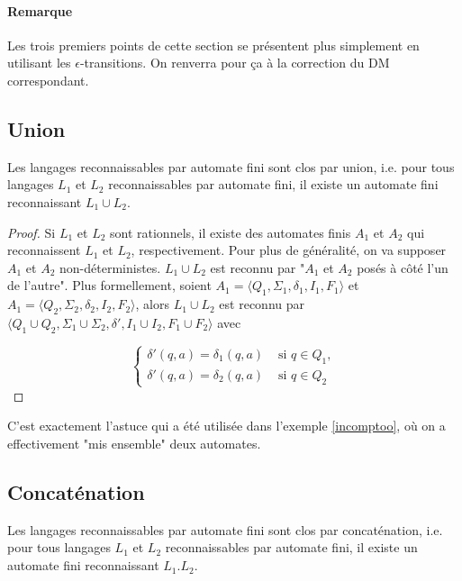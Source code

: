 \paragraph*{Remarque} Les trois premiers points de cette section se présentent plus simplement en utilisant les $\epsilon$-transitions. On renverra pour ça à la correction du DM correspondant.

\subsection{Union}

\begin{theorem}
Les langages reconnaissables par automate fini sont clos par union, i.e. pour tous langages $L_1$ et $L_2$ reconnaissables par automate fini, il existe un automate fini reconnaissant $L_1 \cup L_2$.
\end{theorem}

\begin{proof}

Si $L_1$ et $L_2$ sont rationnels, il existe des automates finis $A_1$ et $A_2$ qui reconnaissent $L_1$ et $L_2$, respectivement. Pour plus de généralité, on va supposer $A_1$ et $A_2$ non-déterministes. $L_1 \cup L_2$ est reconnu par "$A_1$ et $A_2$ posés à côté l'un de l'autre". Plus formellement, soient $A_1 = \big \langle Q_1, \Sigma_1, \delta_1, I_1, F_1\big \rangle$ et $A_1 = \big \langle Q_2, \Sigma_2, \delta_2, I_2, F_2\big \rangle$, alors $L_1 \cup L_2$ est reconnu par $\big \langle Q_1 \cup Q_2, \Sigma_1 \cup \Sigma_2, \delta', I_1 \cup I_2, F_1 \cup F_2\big \rangle$ avec 

\[
\begin{cases}
\delta'(q,a) = \delta_1(q,a) &\text{ si } q \in Q_1,\\[1ex]
\delta'(q,a) = \delta_2(q,a) &\text{ si } q \in Q_2\end{cases}
\]

\end{proof}

C'est exactement l'astuce qui a été utilisée dans l'exemple \ref{incomptoo}, où on a effectivement "mis ensemble" deux automates.

\subsection{Concaténation}

\begin{theorem}
Les langages reconnaissables par automate fini sont clos par concaténation, i.e. pour tous langages $L_1$ et $L_2$ reconnaissables par automate fini, il existe un automate fini reconnaissant $L_1.L_2$.
\end{theorem}

